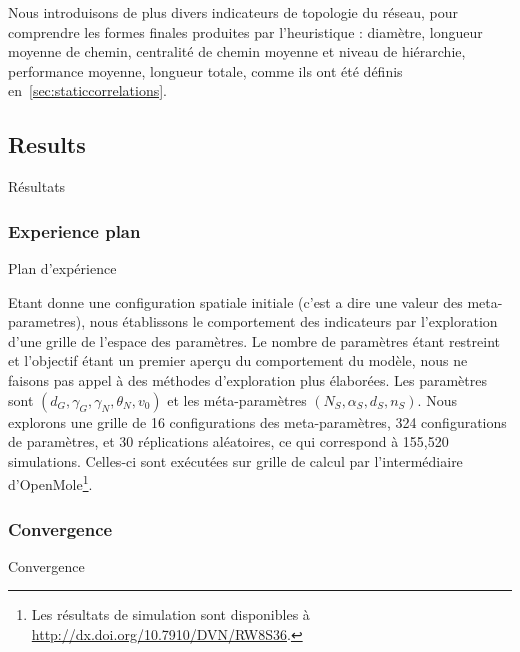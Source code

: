 Nous introduisons de plus divers indicateurs de topologie du réseau, pour comprendre les formes finales produites par l'heuristique : diamètre, longueur moyenne de chemin, centralité de chemin moyenne et niveau de hiérarchie, performance moyenne, longueur totale, comme ils ont été définis en~\ref{sec:staticcorrelations}.




\subsection{Results}{Résultats}


\subsubsection{Experience plan}{Plan d'expérience}

Etant donne une configuration spatiale initiale (c'est a dire une valeur des meta-parametres), nous établissons le comportement des indicateurs par l'exploration d'une grille de l'espace des paramètres. Le nombre de paramètres étant restreint et l'objectif étant un premier aperçu du comportement du modèle, nous ne faisons pas appel à des méthodes d'exploration plus élaborées. Les paramètres sont $(d_G,\gamma_G,\gamma_N,\theta_N,v_0)$ et les méta-paramètres $(N_S,\alpha_S,d_S,n_S)$.  Nous explorons une grille de 16 configurations des meta-paramètres, 324 configurations de paramètres, et 30 réplications aléatoires, ce qui correspond à 155,520 simulations. Celles-ci sont exécutées sur grille de calcul par l'intermédiaire d'OpenMole\footnote{Les résultats de simulation sont disponibles à \url{http://dx.doi.org/10.7910/DVN/RW8S36}.}.



\subsubsection{Convergence}{Convergence}


